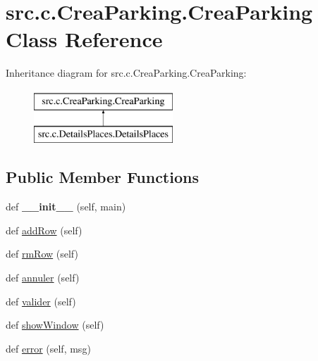 \hypertarget{classsrc_1_1c_1_1_crea_parking_1_1_crea_parking}{}\section{src.\+c.\+Crea\+Parking.\+Crea\+Parking Class Reference}
\label{classsrc_1_1c_1_1_crea_parking_1_1_crea_parking}
Inheritance diagram for src.\+c.\+Crea\+Parking.\+Crea\+Parking\+:\begin{figure}[H]
\begin{center}
\leavevmode
\includegraphics[height=2.000000cm]{classsrc_1_1c_1_1_crea_parking_1_1_crea_parking}
\end{center}
\end{figure}
\subsection*{Public Member Functions}
\begin{DoxyCompactItemize}
\item 
\hypertarget{classsrc_1_1c_1_1_crea_parking_1_1_crea_parking_a5dd47a647cb6c719a40146a759157188}{}def {\bfseries \+\_\+\+\_\+init\+\_\+\+\_\+} (self, main)\label{classsrc_1_1c_1_1_crea_parking_1_1_crea_parking_a5dd47a647cb6c719a40146a759157188}

\item 
def \hyperlink{classsrc_1_1c_1_1_crea_parking_1_1_crea_parking_a8be16e5748ab1139563572860f19c444}{add\+Row} (self)
\item 
def \hyperlink{classsrc_1_1c_1_1_crea_parking_1_1_crea_parking_a0872ef626bfa838d8db59eb49222fc98}{rm\+Row} (self)
\item 
def \hyperlink{classsrc_1_1c_1_1_crea_parking_1_1_crea_parking_ab1d34255599ab5cf8f037cd2bb726f8f}{annuler} (self)
\item 
def \hyperlink{classsrc_1_1c_1_1_crea_parking_1_1_crea_parking_afe0f277326d9a9ca508c4e81b0fc5e39}{valider} (self)
\item 
def \hyperlink{classsrc_1_1c_1_1_crea_parking_1_1_crea_parking_a292789f04bdd9f66c48af51416ab75ea}{show\+Window} (self)
\item 
def \hyperlink{classsrc_1_1c_1_1_crea_parking_1_1_crea_parking_ae4321624a695dd06c7617327ef3f8938}{error} (self, msg)
\end{DoxyCompactItemize}


